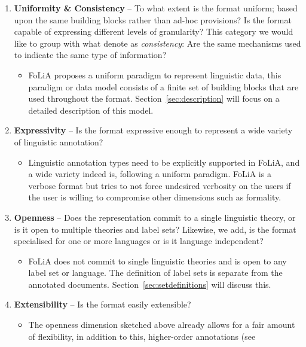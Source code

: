 \documentclass[a4paper,10pt,twoside]{article}
\begin{document}
\begin{enumerate}
\item \textbf{Uniformity \& Consistency} -- To what extent is the format
  uniform; based upon the same building blocks rather than ad-hoc provisions?
  Is the format capable of expressing different levels of granularity? This
  category we would like to group with what  denote as
  \emph{consistency}: Are the same mechanisms used to indicate the same type of
  information?
  \begin{itemize}
    \item[] FoLiA proposes a uniform paradigm to represent linguistic data, this
      paradigm or data model consists of a finite set of building blocks that
      are used throughout the format. Section~\ref{sec:description} will focus
      on a detailed description of this model.
  \end{itemize}
\item \textbf{Expressivity} -- Is the format expressive enough to represent a
  wide variety of linguistic annotation?
  \begin{itemize}
    \item[] Linguistic annotation types need to be explicitly supported in FoLiA,
      and a wide variety indeed is, following a uniform paradigm. FoLiA is a
      verbose format but tries to not force undesired verbosity on the users
      if the user is willing to compromise other dimensions such as formality.
  \end{itemize}
\item \textbf{Openness} -- Does the representation commit to a single linguistic
  theory, or is it open to multiple theories and label sets? Likewise, we add,
  is the format specialised for one or more languages or is it language
  independent?
  \begin{itemize}
    \item[] FoLiA does not commit to single linguistic theories and is open to
      any label set or language. The definition of label sets is separate from
      the annotated documents. Section~\ref{sec:setdefinitions} will discuss
      this.
  \end{itemize}
\item \textbf{Extensibility} -- Is the format easily extensible?
  \begin{itemize}
    \item[] The openness dimension sketched above already allows for a fair
      amount of flexibility, in addition to this, higher-order annotations (see

\end{itemize}
\end{enumerate}
\end{document}
